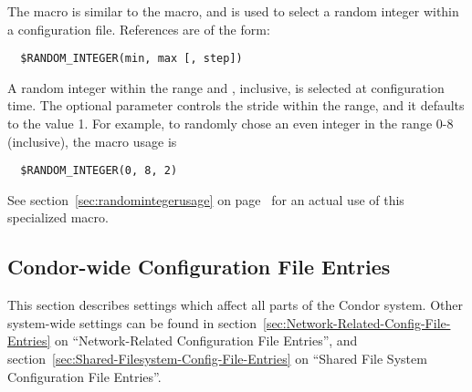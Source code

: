 The  macro is similar to the 
macro, and is used to select a random integer within a configuration file.
References are of the form:
\begin{verbatim}
  $RANDOM_INTEGER(min, max [, step])
\end{verbatim}
A random integer within the range \verb@min@ and \verb@max@, inclusive,
is selected at configuration time.
The optional \verb@step@ parameter
controls the stride within the range, and it defaults to the value 1.
For example, to randomly chose an even integer in the range 0-8 (inclusive),
the macro usage is
\begin{verbatim}
  $RANDOM_INTEGER(0, 8, 2)
\end{verbatim}

See section~\ref{sec:randomintegerusage} on
page~\pageref{sec:randomintegerusage}
for an actual use of this specialized macro.
\subsection{\label{sec:Condor-wide-Config-File-Entries}Condor-wide Configuration File Entries} 


This section describes settings which affect all parts of the Condor
system. 
Other system-wide settings can be found in
section~\ref{sec:Network-Related-Config-File-Entries} on
``Network-Related Configuration File Entries'', and
section~\ref{sec:Shared-Filesystem-Config-File-Entries} on ``Shared
File System Configuration File Entries''. 

